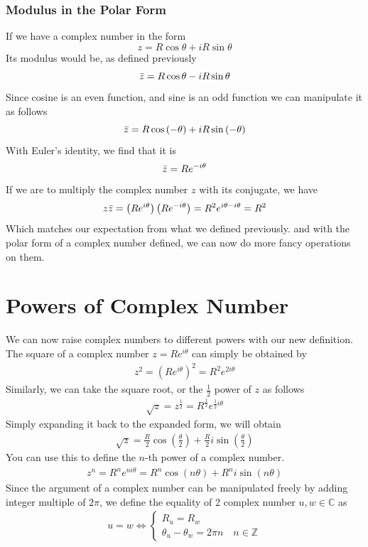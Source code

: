 \documentclass[12pt]{book}
\newcommand{\Z}{\mathbb{Z}}
\newcommand{\C}{\mathbb{C}}
\newcommand{\paren}[1]{\left( #1 \right)}
\begin{document}
\subsubsection{Modulus in the Polar Form}
If we have a complex number in the form
\[
z = R\cos \theta + iR\sin\theta
\]
Its modulus would be, as defined previously
\[
\Bar{z} = R\cos \theta - iR\sin\theta
\]
Since cosine is an even function, and sine is an odd function we can manipulate it as follows
\[
\Bar{z} = R\cos \paren{-\theta} + iR\sin\paren{-\theta}
\]
With Euler's identity, we find that it is
\begin{align}
    \Bar{z} = Re^{-i\theta}
\end{align}
If we are to multiply the complex number $z$ with its conjugate, we have
\[
z\Bar{z} = \paren{Re^{i\theta}}\paren{Re^{-i\theta}} = R^2e^{i\theta-i\theta} = R^2
\]
Which matches our expectation from what we defined previously. and with the polar form of a complex number defined, we can now do more fancy operations on them.

\section{Powers of Complex Number}
We can now raise complex numbers to different powers with our new definition. The square of a complex number $z = Re^{i\theta}$ can simply be obtained by 
\begin{align}
    z^2 = \paren{Re^{i\theta}}^2 = R^2 e^{2i\theta}
\end{align}
Similarly, we can take the square root, or the $\frac{1}{2}$ power of $z$ as follows
\begin{align}
    \sqrt{z} = z^{\frac{1}{2}} = R^{\frac{1}{2}}e^{\frac{1}{2}i\theta}
\end{align}
Simply expanding it back to the expanded form, we will obtain
\begin{align}
    \sqrt{z} = \frac{R}{2}\cos\paren{\frac{\theta}{2}} + \frac{R}{2}i\sin\paren{\frac{\theta}{2}}
\end{align}
You can use this to define the $n$-th power of a complex number. 
\begin{align}
    z^n = R^n e^{ni\theta} = R^n\cos\paren{n\theta} + R^ni\sin\paren{n\theta}
\end{align}
Since the argument of a complex number can be manipulated freely by adding integer multiple of $2\pi$, we define the equality of 2 complex number $u,w \in \C$ as
\begin{align}
    u = w \iff
    \begin{cases}
        R_u = R_w\\
        \theta_u - \theta_w = 2\pi n \quad n \in \Z
    \end{cases}
\end{align}
\end{document}
